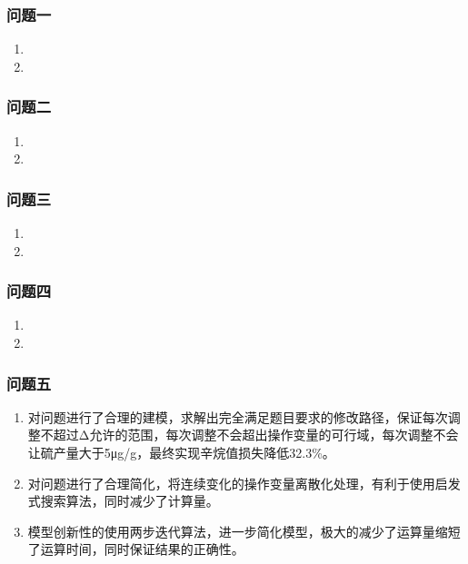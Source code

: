 \documentclass[bwprint]{gmcmthesis}
\begin{document}
\subsubsection{问题一}
\begin{enumerate}[itemindent=20pt]
    \item 
    \item 
\end{enumerate}

\FloatBarrier
\subsubsection{问题二}
\begin{enumerate}[itemindent=20pt]
    \item 
    \item 
\end{enumerate}


\FloatBarrier
\subsubsection{问题三}
\begin{enumerate}[itemindent=20pt]
    \item 
    \item 
\end{enumerate}


\FloatBarrier
\subsubsection{问题四}
\begin{enumerate}[itemindent=20pt]
    \item 
    \item 
\end{enumerate}

\FloatBarrier
\subsubsection{问题五}
\begin{enumerate}[itemindent=20pt]
    \item 对问题进行了合理的建模，求解出完全满足题目要求的修改路径，保证每次调整不超过Δ允许的范围，每次调整不会超出操作变量的可行域，每次调整不会让硫产量大于5μg/g，最终实现辛烷值损失降低32.3\%。
    \item 对问题进行了合理简化，将连续变化的操作变量离散化处理，有利于使用启发式搜索算法，同时减少了计算量。
    \item 模型创新性的使用两步迭代算法，进一步简化模型，极大的减少了运算量缩短了运算时间，同时保证结果的正确性。
\end{enumerate}
\end{document}

